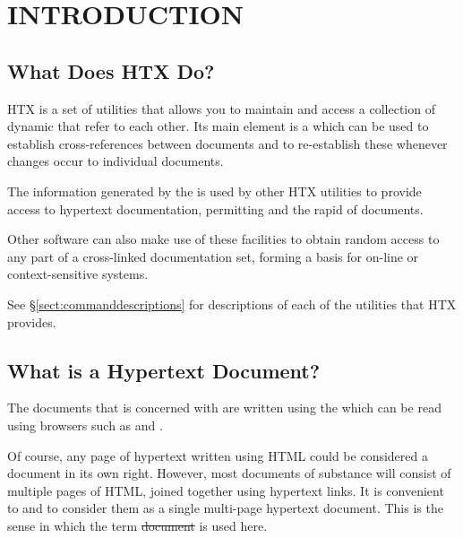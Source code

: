 \section{INTRODUCTION}

\subsection{\label{sect:HTX}What Does HTX Do?}

HTX is a set of utilities that allows you to maintain and access a
collection of dynamic  that
refer to each other. Its main element is a  which can be used to establish cross-references between
documents and to re-establish these whenever changes occur to
individual documents.

The information generated by the  is used by other HTX utilities to
provide access to hypertext documentation, permitting
 and the rapid
 of
documents.

Other software can also make use of these facilities to obtain random
access to any part of a cross-linked documentation set, forming a
basis for on-line or context-sensitive  systems.

See \S\ref{sect:commanddescriptions} for descriptions of each of the
utilities that HTX provides.

\subsection{\label{sect:hypertextdocuments}What is a Hypertext Document?}

The documents that  is concerned with are written using
the  which can be read using 
browsers such as  and .

Of course, any page of hypertext written using HTML could be
considered a document in its own right. However, most documents of
substance will consist of multiple pages of HTML, joined together
using hypertext links. It is convenient to  and to consider them as a single multi-page
hypertext document. This is the sense in which the term \st{document}
is used here.

